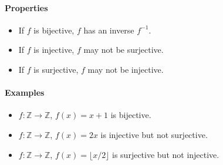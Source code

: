 \paragraph*{Properties}
\begin{itemize}
    \item If $f$ is bijective, $f$ has an inverse $f^{-1}$.
    \item If $f$ is injective, $f$ may not be surjective.
    \item If $f$ is surjective, $f$ may not be injective.
\end{itemize}

\paragraph*{Examples}
\begin{itemize}
    \item $f: \mathbb{Z} \to \mathbb{Z}$, $f(x) = x + 1$ is bijective.
    \item $f: \mathbb{Z} \to \mathbb{Z}$, $f(x) = 2x$ is injective but not surjective.
    \item $f: \mathbb{Z} \to \mathbb{Z}$, $f(x) = \lfloor x/2 \rfloor$ is surjective but not injective.
\end{itemize}

